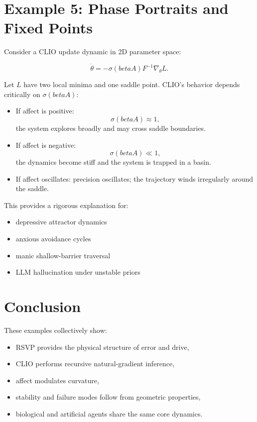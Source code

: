 \documentclass[12pt,oneside]{book}
\theoremstyle{plain}
\theoremstyle{definition}
\def\beta{beta}%
\begin{document}
\section{Example 5: Phase Portraits and Fixed Points}

Consider a CLIO update dynamic in 2D parameter space:

\[
\dot{\theta} = -\sigma(\beta A) F^{-1} \nabla_\theta L.
\]

Let $L$ have two local minima and one saddle point.
CLIO’s behavior depends critically on $\sigma(\beta A)$:

\begin{itemize}
    \item If affect is positive:
    \[
    \sigma(\beta A) \approx 1,
    \]
    the system explores broadly and may cross saddle boundaries.

    \item If affect is negative:
    \[
    \sigma(\beta A) \ll 1,
    \]
    the dynamics become stiff and the system is trapped in a basin.

    \item If affect oscillates:
    precision oscillates; the trajectory winds irregularly around the saddle.
\end{itemize}

This provides a rigorous explanation for:

\begin{itemize}
    \item depressive attractor dynamics
    \item anxious avoidance cycles
    \item manic shallow-barrier traversal
    \item LLM hallucination under unstable priors
\end{itemize}

\section{Conclusion}

These examples collectively show:

\begin{itemize}
    \item RSVP provides the physical structure of error and drive,
    \item CLIO performs recursive natural-gradient inference,
    \item affect modulates curvature,
    \item stability and failure modes follow from geometric properties,
    \item biological and artificial agents share the same core dynamics.
\end{itemize}
\end{document}
